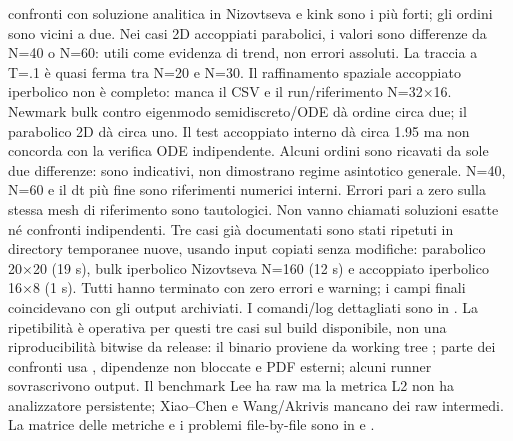 {}
\markdownRendererSectionEnd \markdownRendererSectionBegin
{}\markdownRendererInterblockSeparator
{} confronti con soluzione analitica in Nizovtseva e kink sono i più forti; gli ordini sono vicini a due. Nei casi 2D accoppiati parabolici, i valori sono differenze da N=40 o N=60: utili come evidenza di trend, non errori assoluti. La traccia a T=.1 è quasi ferma tra N=20 e N=30. Il raffinamento spaziale accoppiato iperbolico non è completo: manca il CSV e il run/riferimento N=32×16.\markdownRendererInterblockSeparator
{} Newmark bulk contro eigenmodo semidiscreto/ODE dà ordine circa due; il parabolico 2D dà circa uno. Il test accoppiato interno dà circa 1.95 ma non concorda con la verifica ODE indipendente. Alcuni ordini sono ricavati da sole due differenze: sono indicativi, non dimostrano regime asintotico generale.\markdownRendererInterblockSeparator
{} N=40, N=60 e il dt più fine sono riferimenti numerici interni. Errori pari a zero sulla stessa mesh di riferimento sono tautologici. Non vanno chiamati soluzioni esatte né confronti indipendenti.\markdownRendererInterblockSeparator
{}
\markdownRendererSectionEnd \markdownRendererSectionBegin
{}\markdownRendererInterblockSeparator
{}Tre casi già documentati sono stati ripetuti in directory temporanee nuove, usando input copiati senza modifiche: parabolico 20×20 (19 s), bulk iperbolico Nizovtseva N=160 (12 s) e accoppiato iperbolico 16×8 (1 s). Tutti hanno terminato con zero errori e warning; i campi finali coincidevano con gli output archiviati. I comandi/log dettagliati sono in .\markdownRendererInterblockSeparator
{}La ripetibilità è operativa per questi tre casi sul build disponibile, non una riproducibilità bitwise da release: il binario proviene da working tree ; parte dei confronti usa , dipendenze non bloccate e PDF esterni; alcuni runner sovrascrivono output. Il benchmark Lee ha raw ma la metrica L2 non ha analizzatore persistente; Xiao–Chen e Wang/Akrivis mancano dei raw intermedi. La matrice delle metriche e i problemi file-by-file sono in  e .\markdownRendererInterblockSeparator
